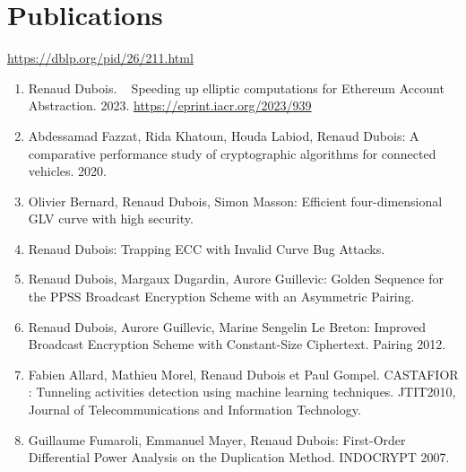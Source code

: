 \documentclass[letter,10pt]{article}
\begin{document}
\section{Publications}
 \url{https://dblp.org/pid/26/211.html}
 \begin{enumerate}
 \item Renaud Dubois. {~ Speeding up elliptic computations for Ethereum Account Abstraction. 2023.} \url{https://eprint.iacr.org/2023/939}
  \item Abdessamad Fazzat, Rida Khatoun, Houda Labiod, Renaud Dubois: A comparative performance study of cryptographic algorithms for connected vehicles. 2020.
 \item 	Olivier Bernard, Renaud Dubois, Simon Masson: Efficient four-dimensional GLV curve with high security.
 \item Renaud Dubois: Trapping ECC with Invalid Curve Bug Attacks. 
 \item Renaud Dubois, Margaux Dugardin, Aurore Guillevic: Golden Sequence for the PPSS Broadcast Encryption Scheme with an Asymmetric Pairing.
 \item Renaud Dubois, Aurore Guillevic, Marine Sengelin Le Breton:
Improved Broadcast Encryption Scheme with Constant-Size Ciphertext. Pairing 2012. 
\item Fabien Allard, Mathieu Morel, Renaud Dubois et Paul Gompel. CASTAFIOR : Tunneling activities detection using machine learning techniques. JTIT2010, Journal of Telecommunications and Information Technology. 
 \item 	Guillaume Fumaroli, Emmanuel Mayer, Renaud Dubois:
First-Order Differential Power Analysis on the Duplication Method. INDOCRYPT 2007.
 \end{enumerate} 
 
   
\end{document}
